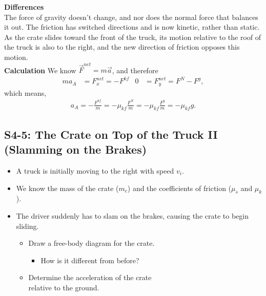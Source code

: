 \documentclass[]{article}
\begin{document}
\begin{TeacherMargin}
\begin{center}
\end{center}
\textbf{Differences} \\
The force of gravity doesn't change, and nor does the normal force that balances it out. The friction has switched directions and is now kinetic, rather than static. As the crate slides toward the front of the truck, its motion relative to the roof of the truck is also to the right, and the new direction of friction opposes this motion. \\

\noindent\textbf{Calculation}
We know $\vec{F}^{net} = m\vec{a}$, and therefore
\begin{align*}
	ma_{A} & = F^{net}_{x} = -F^{kf} & 0 & = F^{net}_{y} = F^{N} - F^{g},
\end{align*}
which means,
\begin{align*}
	a_{A} = -\frac{F^{kf}}{m} = -\mu_{kf} \frac{F^{N}}{m} = -\mu_{kf} \frac{F^{g}}{m} = -\mu_{kf} g. 
\end{align*}
\end{TeacherMargin}
\begin{PresentSpace}
\vspace{-10pt}
\section*{S4-5: The Crate on Top of the Truck II (Slamming on the Brakes)}
\vspace{-10pt}
\begin{itemize}
	\item A truck is initially moving to the right with speed $v_{i}$.
	\item We know the mass of the crate ($m_{c}$) and the coefficients of friction ($\mu_{s}$ and $\mu_{k}$).
	\item The driver suddenly has to slam on the brakes, causing the crate to begin sliding.
	\begin{itemize}
		\item Draw a free-body diagram for the crate.
		\begin{itemize}
			\item How is it different from before?
		\end{itemize}
		\item Determine the acceleration of the crate \\
		relative to the ground.
	\end{itemize}
\end{itemize}
\end{PresentSpace}
\end{document}
